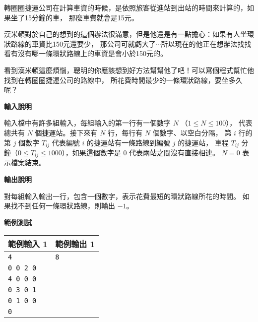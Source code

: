     轉圈圈捷運公司在計算車資的時候，是依照旅客從進站到出站的時間來計算的，如果坐了15分鐘的車，
    那麼車費就會是15元。

    漢米頓對於自己的想到的這個辦法很滿意，但是他還是有一點擔心：如果有人坐環狀路線的車資比150元還要少，
    那公司可就虧大了$\cdots$所以現在的他正在想辦法找找看有沒有哪一條環狀路線上的車資是會小於150元的。

    看到漢米頓這麼煩惱，聰明的你應該想到好方法幫幫他了吧！可以寫個程式幫忙他找到在轉圈圈捷運公司的路線中，
    所花費時間最少的一條環狀路線，要坐多久呢？

    \textbf{輸入說明}

    輸入檔中有許多組輸入，每組輸入的第一行有一個數字 $N$ （$1 \leq N \leq 100$），
    代表總共有 $N$ 個捷運站。接下來有 $N$ 行，每行有 $N$ 個數字、以空白分隔，
    第 $i$ 行的第 $j$ 個數字 $T_{ij}$ 代表編號 $i$ 的捷運站有一條路線到編號 $j$ 的捷運站，
    車程 $T_{ij}$ 分鐘（$0 \leq T_{ij} \leq 1000$），如果這個數字是 $0$ 代表兩站之間沒有直接相連。
    $N = 0$ 表示檔案結束。

    \textbf{輸出說明}

    對每組輸入輸出一行，包含一個數字，表示花費最短的環狀路線所花的時間。
    如果找不到任何一條環狀路線，則輸出 $-1$。

    \textbf{範例測試}

    \begin{tabular}{|m{7cm}|m{7cm}|}
        \hline
        範例輸入 1 & 範例輸出 1 \\
        \hline
        \verb|4| & \verb|8| \\
        \verb|0 0 2 0| & \\
        \verb|4 0 0 0| & \\
        \verb|0 3 0 1| & \\
        \verb|0 1 0 0| & \\
        \verb|0| & \\
        \hline
    \end{tabular}